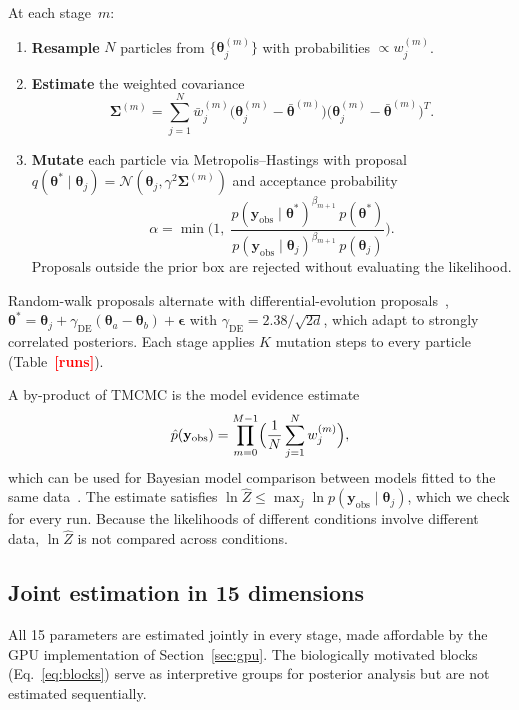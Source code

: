 \documentclass[pdflatex,sn-mathphys-num,lineno]{sn-jnl}
\newcommand{\btheta}{\boldsymbol{\theta}}
\newcommand{\yobs}{\mathbf{y}_{\mathrm{obs}}}
\newcommand{\TBD}[1]{\textcolor{red}{\textbf{[#1]}}}
\begin{document}
At each stage~$m$:
\begin{enumerate}[nosep,leftmargin=*]
\item \textbf{Resample} $N$ particles from $\{\btheta_j^{(m)}\}$ with probabilities $\propto w_j^{(m)}$.
\item \textbf{Estimate} the weighted covariance
\begin{equation}
\boldsymbol{\Sigma}^{(m)}
= \sum_{j=1}^{N}\bar{w}_j^{(m)}
\bigl(\btheta_j^{(m)}-\bar{\btheta}^{(m)}\bigr)
\bigl(\btheta_j^{(m)}-\bar{\btheta}^{(m)}\bigr)^T.
\label{eq:cov}
\end{equation}
\item \textbf{Mutate} each particle via Metropolis--Hastings with proposal $q(\btheta^*\mid\btheta_j)=\mathcal{N}(\btheta_j,\gamma^2\boldsymbol{\Sigma}^{(m)})$ and acceptance probability
\begin{equation}
\alpha = \min\!\biggl(1,\;
\frac{p(\yobs\mid\btheta^*)^{\beta_{m+1}}\,p(\btheta^*)}
     {p(\yobs\mid\btheta_j)^{\beta_{m+1}}\,p(\btheta_j)}\biggr).
\label{eq:accept}
\end{equation}
Proposals outside the prior box are rejected without evaluating the likelihood.
\end{enumerate}
Random-walk proposals alternate with differential-evolution proposals~\cite{terBraak2006DEMC}, $\btheta^*=\btheta_j+\gamma_{\mathrm{DE}}(\btheta_a-\btheta_b)+\boldsymbol{\epsilon}$ with $\gamma_{\mathrm{DE}}=2.38/\sqrt{2d}$, which adapt to strongly correlated posteriors.
Each stage applies $K$ mutation steps to every particle (Table~\TBD{runs}).

A by-product of TMCMC is the model evidence estimate
\begin{equation}
\hat{p}(\yobs) = \prod_{m=0}^{M-1}\Bigl(\frac{1}{N}\sum_{j=1}^{N}w_j^{(m)}\Bigr),
\label{eq:evidence}
\end{equation}
which can be used for Bayesian model comparison between models fitted to the same data~\cite{KassRaftery1995BayesFactor}.
The estimate satisfies $\ln\hat{Z}\le\max_j\ln p(\yobs\mid\btheta_j)$, which we check for every run.
Because the likelihoods of different conditions involve different data, $\ln\hat{Z}$ is not compared across conditions.

\subsection{Joint estimation in 15 dimensions}

All 15 parameters are estimated jointly in every stage, made affordable by the GPU implementation of Section~\ref{sec:gpu}.
The biologically motivated blocks (Eq.~\ref{eq:blocks}) serve as interpretive groups for posterior analysis but are not estimated sequentially.
\end{document}
